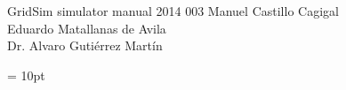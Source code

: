 \documentclass[twoside,a4paper,11pt]{book}
\begin{document}


\frontpage
	{GridSim simulator manual}
	{2014}
	{003}
	{Manuel Castillo Cagigal\\Eduardo Matallanas de Avila\\Dr. Alvaro Guti\'errez Mart\'in}

\tableofcontents
\newpage 

\baselineskip=15pt
\parskip = 10pt
\marginsize{3cm}{3cm}{2cm}{2cm}












\end{document}
